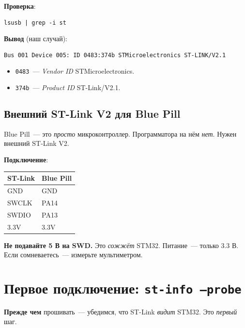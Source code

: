 \textbf{Проверка}:

\begin{verbatim}
lsusb | grep -i st
\end{verbatim}

\textbf{Вывод} (наш случай):

\begin{verbatim}
Bus 001 Device 005: ID 0483:374b STMicroelectronics ST-LINK/V2.1
\end{verbatim}

\begin{itemize}
    \item \texttt{0483}~--- \emph{Vendor ID} STMicroelectronics.
    \item \texttt{374b}~--- \emph{Product ID} ST-Link/V2.1.
\end{itemize}

\subsection{Внешний ST-Link V2 для Blue Pill}

Blue Pill~--- это \emph{просто} микроконтроллер.
Программатора на нём \emph{нет}. Нужен внешний ST-Link V2.

\textbf{Подключение}:

\begin{center}
\begin{tabular}{ll}
ST-Link & Blue Pill \\
\hline
GND     & GND \\
SWCLK   & PA14 \\
SWDIO   & PA13 \\
3.3V    & 3.3V \\
\end{tabular}
\end{center}

\begin{warnbox}
\textbf{Не подавайте 5 В на SWD.} Это \emph{сожжёт} STM32.
Питание~--- только 3.3 В. Если сомневаетесь~--- измерьте
мультиметром.
\end{warnbox}

\section{Первое подключение: \texttt{st-info --probe}}
\label{sec:flashing-first-connect}

\textbf{Прежде чем} прошивать~--- убедимся, что ST-Link
\emph{видит} STM32. Это \emph{первый} шаг.

